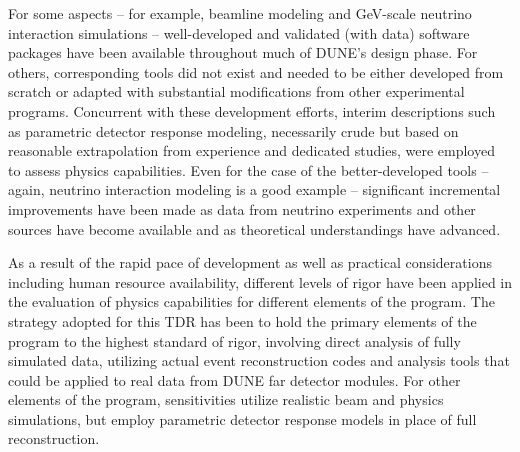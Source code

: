 For some aspects -- for example, beamline modeling
and GeV-scale neutrino interaction simulations --
well-developed and validated (with data) software packages have
been available throughout much of DUNE's design phase.
For others, corresponding tools did not exist and needed to be
either developed from scratch or adapted with substantial
modifications from other experimental programs.  Concurrent
with these development efforts, interim descriptions such
as parametric detector response modeling, necessarily crude
but based on reasonable extrapolation from experience and
dedicated studies, were employed to assess physics capabilities.
Even for the case of the better-developed tools -- again, neutrino 
interaction modeling is a good example -- significant incremental
improvements have been made as data from neutrino experiments
and other sources have become available and as theoretical
understandings have advanced.

As a result of the rapid pace of development as well as 
practical considerations including human 
resource availability, different levels
of rigor have been applied in the evaluation of physics 
capabilities for different elements of the program.  
The strategy adopted for
this TDR has been to hold the primary elements of the program
to the highest standard of rigor, involving direct analysis
of fully simulated data, utilizing actual event reconstruction
codes and analysis tools that could be applied to real data
from DUNE far detector modules.  For other elements of the
program, sensitivities utilize realistic beam and
physics simulations, but employ parametric detector
response models in place of full reconstruction.


